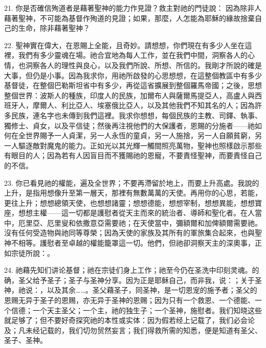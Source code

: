 21. 你是否確信殉道者是藉著聖神的能力作見證？救主對祂的門徒說： 因為除非人藉著聖神，不可能為基督作殉道的見證；如果，那麼，人怎能為耶穌的緣故捨棄自己的生命，除非藉著聖神？\par

22. 聖神實在偉大，在恩賜上全能，且奇妙。請想想，你們現在有多少人坐在這裡，我們有多少靈魂在場。祂合宜地為每人工作，並在我們中間，洞察各人的心情，也洞察各人的理性與良心，以及我們所說、所想、所信的。我剛才所說的確是大事，但仍是小事。因為我求你，用祂所啟發的心思想想，在這整個教區中有多少基督徒，在整個巴勒斯坦省中有多少，再從這省擴展到整個羅馬帝國；之後，思想整個世界：波斯人的種族，印度人的民族，加爾布人與薩爾馬提亞人，高盧人與西班牙人，摩爾人、利比亞人、埃塞俄比亞人，以及其他我們不知其名的人；因為許多民族，連名字也未傳到我們這裡。我求你想想，每個民族的主教、司鐸、執事、獨修士、貞女，以及平信徒；然後再注視他們的大保護者，恩賜的分施者——祂如何在全世界賜予一人貞潔，另一人永恆的童貞，另一人施捨，另一人自願貧窮，另一人驅逐敵對魔鬼的能力。正如光以其光輝一觸間照亮萬物，聖神也照樣啟示那些有眼目的人；因為若有人因盲目而不獲賜祂的恩寵，不要責怪聖神，而要責怪自己的不信。\par

23. 你已看見祂的權能，遍及全世界；不要再滯留於地上，而要上升高處。我說的上升，是指用想像升至第一層天，那裡有無數萬萬的天使。再用你的心思，若能，更往上升；想想總領天使，也想想諸靈；想想德能，想想宰制，想想異能，想想寶座，想想主權——這一切都是護慰者從天主而來的統治者、導師和聖化者。在人當中，厄里亞、厄里叟和依撒意亞需要祂；在天使當中，彌額爾和加俾額爾需要祂。沒有任何受造物與祂同等尊榮；因為天使的家族及其所有的軍旅集合起來，也與聖神不相等。護慰者至卓越的權能籠罩這一切。他們，但祂卻洞察天主的深奧事，正如宗徒所說：。\par

24. 祂藉先知们讲论基督；祂在宗徒们身上工作；祂至今仍在圣洗中印刻灵魂。的确，圣父给予圣子；圣子与圣神分享。因为正是耶稣自己，而非我，说：；关于圣神，祂说：，以及其余……。圣父藉圣子，同圣神，是一切恩宠的施予者；圣父的恩赐无异于圣子的恩赐，亦无异于圣神的恩赐；因为只有一个救恩、一个德能、一个信德；一个天主圣父；一个主，祂的独生子；一个圣神，施慰者。我们知晓这些就足够了；但不要好奇探究祂的本性或实体：因为假若经上记载了，我们必会论及；凡未经记载的，我们切勿贸然妄言；我们得救所需的知悉，便是知道有圣父、圣子、圣神。\par

